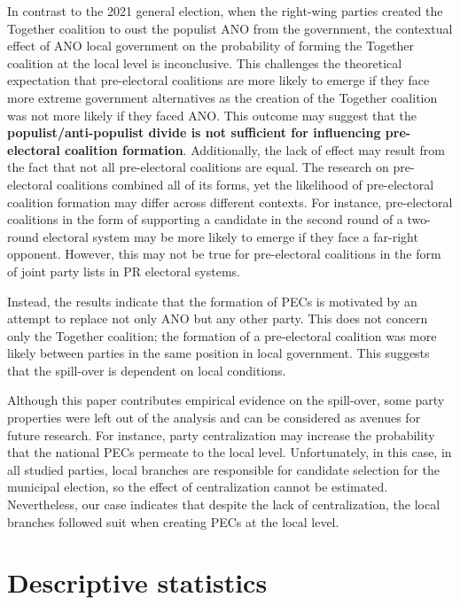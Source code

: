 \documentclass[]{interact}
\theoremstyle{plain}%
\theoremstyle{definition}
\theoremstyle{remark}
\begin{document}
In contrast to the 2021 general election, when the right-wing parties created the Together coalition to oust the populist ANO from the government, the contextual effect of ANO local government on the probability of forming the Together coalition at the local level is inconclusive. This challenges the theoretical expectation that pre-electoral coalitions are more likely to emerge if they face more extreme government alternatives as the creation of the Together coalition was not more likely if they faced ANO. This outcome may suggest that the \textbf{populist/anti-populist divide is not sufficient for influencing pre-electoral coalition formation}. Additionally, the lack of effect may result from the fact that not all pre-electoral coalitions are equal. The research on pre-electoral coalitions combined all of its forms, yet the likelihood of pre-electoral coalition formation may differ across different contexts. For instance, pre-electoral coalitions in the form of supporting a candidate in the second round of a two-round electoral system may be more likely to emerge if they face a far-right opponent. However, this may not be true for pre-electoral coalitions in the form of joint party lists in PR electoral systems. 

Instead, the results indicate that the formation of PECs is motivated by an attempt to replace not only ANO but any other party. This does not concern only the Together coalition; the formation of a pre-electoral coalition was more likely between parties in the same position in local government. This suggests that the spill-over is dependent on local conditions. 

Although this paper contributes empirical evidence on the spill-over, some party properties were left out of the analysis and can be considered as avenues for future research. For instance, party centralization may increase the probability that the national PECs permeate to the local level. Unfortunately, in this case, in all studied parties, local branches are responsible for candidate selection for the municipal election, so the effect of centralization cannot be estimated. Nevertheless, our case indicates that despite the lack of centralization, the local branches followed suit when creating PECs at the local level. 




\newpage
\appendix

\section{Descriptive statistics}
\end{document}
